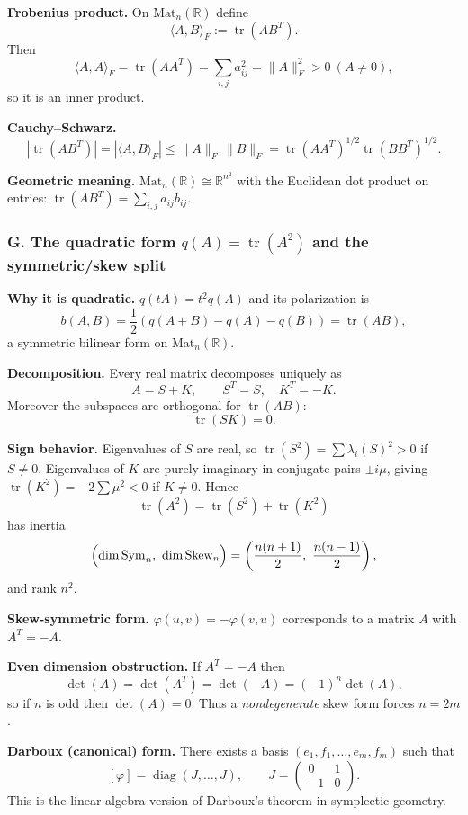 \begin{problem}[CP-I-0055]
\textbf{Frobenius product.}
On $\mathrm{Mat}_n(\mathbb R)$ define
\[
\langle A,B\rangle_F := \operatorname{tr}(AB^T).
\]
Then
\[
\langle A,A\rangle_F = \operatorname{tr}(AA^T)=\sum_{i,j}a_{ij}^2=\|A\|_F^2>0\ (A\neq 0),
\]
so it is an inner product.

\textbf{Cauchy--Schwarz.}
\[
|\operatorname{tr}(AB^T)| = |\langle A,B\rangle_F|
\le \|A\|_F\,\|B\|_F
= \operatorname{tr}(AA^T)^{1/2}\operatorname{tr}(BB^T)^{1/2}.
\]

\textbf{Geometric meaning.}
$\mathrm{Mat}_n(\mathbb R)\cong \mathbb R^{n^2}$ with the Euclidean dot product on entries:
$\operatorname{tr}(AB^T)=\sum_{i,j}a_{ij}b_{ij}$.

\subsubsection*{G. The quadratic form $q(A)=\operatorname{tr}(A^2)$ and the symmetric/skew split}

\textbf{Why it is quadratic.}
$q(tA)=t^2q(A)$ and its polarization is
\[
b(A,B)=\frac12(q(A+B)-q(A)-q(B))=\operatorname{tr}(AB),
\]
a symmetric bilinear form on $\mathrm{Mat}_n(\mathbb R)$.

\textbf{Decomposition.}
Every real matrix decomposes uniquely as
\[
A=S+K,\qquad S^T=S,\quad K^T=-K.
\]
Moreover the subspaces are orthogonal for $\operatorname{tr}(AB)$:
\[
\operatorname{tr}(SK)=0.
\]

\textbf{Sign behavior.}
Eigenvalues of $S$ are real, so $\operatorname{tr}(S^2)=\sum \lambda_i(S)^2>0$ if $S\neq 0$.
Eigenvalues of $K$ are purely imaginary in conjugate pairs $\pm i\mu$, giving $\operatorname{tr}(K^2)=-2\sum \mu^2<0$ if $K\neq 0$.
Hence
\[
\operatorname{tr}(A^2)=\operatorname{tr}(S^2)+\operatorname{tr}(K^2)
\]
has inertia
\[
\Bigl(\dim \mathrm{Sym}_n,\ \dim \mathrm{Skew}_n\Bigr)
=
\left(\frac{n(n+1)}2,\ \frac{n(n-1)}2\right),
\]
and rank $n^2$.

\textbf{Skew-symmetric form.}
$\varphi(u,v)=-\varphi(v,u)$ corresponds to a matrix $A$ with $A^T=-A$.

\textbf{Even dimension obstruction.}
If $A^T=-A$ then
\[
\det(A)=\det(A^T)=\det(-A)=(-1)^n\det(A),
\]
so if $n$ is odd then $\det(A)=0$.
Thus a \emph{nondegenerate} skew form forces $n=2m$.

\textbf{Darboux (canonical) form.}
There exists a basis $(e_1,f_1,\dots,e_m,f_m)$ such that
\[
[\varphi]=\operatorname{diag}(J,\dots,J),\qquad J=\begin{pmatrix}0&1\\-1&0\end{pmatrix}.
\]
This is the linear-algebra version of Darboux's theorem in symplectic geometry.


\end{problem}
